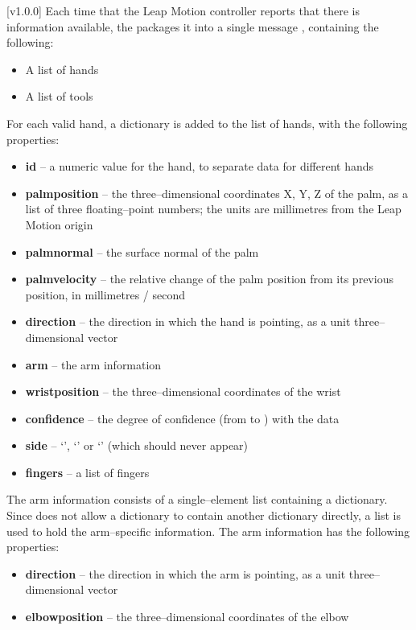 [v1.0.0]
Each time that the Leap Motion controller reports that there is information available,
the  packages it into a single message
\openSq{}\closeSq, containing the following:
\begin{itemize}
\item A list of hands
\item A list of tools
\end{itemize}

For each valid hand, a dictionary \openSq{}\closeSq{} is added to the list
of hands, with the following properties:
\begin{itemize}
\item \textbf{id} -- a numeric value for the hand, to separate data for different hands
\item \textbf{palmposition} -- the three--dimensional coordinates \openSq{}X, Y,
Z\closeSq{} of the palm, as a list of three floating--point numbers; the units are
millimetres from the Leap Motion origin
\item \textbf{palmnormal} -- the surface normal of the palm
\item \textbf{palmvelocity} -- the relative change of the palm position from its previous
position, in millimetres / second
\item \textbf{direction} -- the direction in which the hand is pointing, as a unit
three--dimensional vector
\item \textbf{arm} -- the arm information
\item \textbf{wristposition} -- the three--dimensional coordinates of the wrist
\item \textbf{confidence} -- the degree of confidence (from  to ) with
the data
\item \textbf{side} -- `', `' or `' (which
should never appear)
\item \textbf{fingers} -- a list of fingers
\end{itemize}

The arm information consists of a single--element list containing a dictionary.
Since \yarp{} does not allow a dictionary to contain another dictionary directly, a list
is used to hold the arm--specific information.
The arm information has the following properties:
\begin{itemize}
\item \textbf{direction} -- the direction in which the arm is pointing, as a unit
three--dimensional vector
\item \textbf{elbowposition} -- the three--dimensional coordinates of the elbow
\end{itemize}

